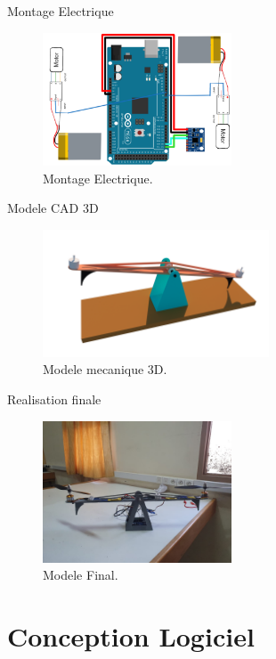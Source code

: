 \documentclass{beamer}
\begin{document}
\begin{frame}{Montage Electrique}
	\begin{figure}
		\centering
		\includegraphics[width=0.5\textwidth]{assets/final-circuit.png}
		\caption{Montage Electrique.}
	\end{figure}
\end{frame}
\begin{frame}{Modele CAD 3D}
	\begin{figure}
		\centering
		\includegraphics[width=0.6\textwidth]{assets/3d-cad.png}
		\caption{Modele mecanique 3D.}
	\end{figure}
\end{frame}

\begin{frame}{Realisation finale}
	\begin{figure}
		\centering
		\includegraphics[width=0.5\textwidth]{assets/final-model.jpeg}
		\caption{Modele Final.}
	\end{figure}
\end{frame}


\section{Conception Logiciel}
\end{document}
